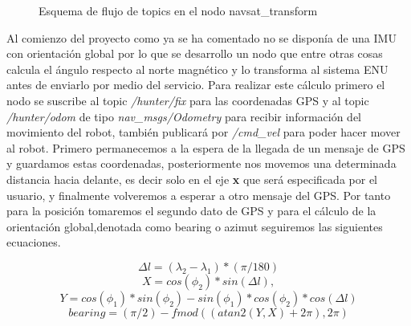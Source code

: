 \begin{figure}[h]
    

\begin{center}
\caption{Esquema de flujo de topics en el nodo navsat\_transform}
\label{fig:esquema_navsat}
\end{center}
\end{figure}

Al comienzo del proyecto como ya se ha comentado no se disponía de una IMU con orientación global por lo que se desarrollo un nodo que 
entre otras cosas calcula el ángulo respecto al norte magnético y lo transforma al sistema ENU antes de enviarlo por medio del servicio.
Para realizar este cálculo primero el nodo se suscribe al topic \textit{/hunter/fix} para las coordenadas GPS y al topic 
\textit{/hunter/odom} de tipo \textit{nav\_msgs/Odometry} para recibir información del movimiento del robot, también publicará por 
\textit{/cmd\_vel} para poder hacer mover al robot. 
Primero permanecemos a la espera de la llegada de un mensaje de GPS y guardamos estas coordenadas, posteriormente nos movemos una 
determinada distancia hacia delante, es decir solo en el eje \textbf{x} que será 
especificada por el usuario, y finalmente volveremos a esperar a otro mensaje del GPS. Por tanto para la posición tomaremos el segundo 
dato de GPS y para el cálculo de la orientación global,denotada como bearing o azimut seguiremos las siguientes ecuaciones.


\begin{equation}\label{eq:delta_longitud}
\Delta{l} =( \lambda_{2} - \lambda_{1} ) * (\pi/180) 
\end{equation}
\begin{equation}\label{eq:calculo_x}
X = cos(\phi_{2}) * sin(\Delta{l}), 
\end{equation}
\begin{equation}\label{eq:calculo_y}
Y = cos(\phi_{1}) * sin(\phi_{2}) - sin(\phi_{1}) * cos(\phi_{2}) * cos(\Delta{l})
\end{equation}
\begin{equation}\label{eq:calculo_bearing}
bearing = (\pi/2) - fmod((atan2(Y,X) + 2\pi),2\pi)
\end{equation}

